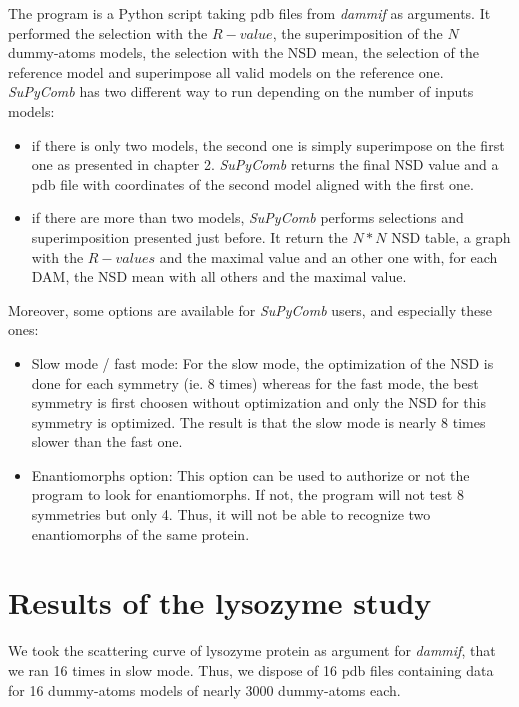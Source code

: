 \documentclass[a4paper, 11pt]{report}
\begin{document}
The program is a Python script taking pdb files from \textit{dammif} 
as arguments. 
It performed the selection with the $R-value$, the superimposition of 
the $N$ dummy-atoms models, the selection with the NSD mean, the 
selection of the reference model and superimpose all valid models on 
the reference one.\\
\textit{SuPyComb} has two different way to run depending on the number 
of inputs models:
\begin{itemize}
  \item if there is only two models, the second one is simply 
        superimpose on the first one as presented in chapter 2.
        \textit{SuPyComb} returns the final NSD value and a pdb file 
        with coordinates of the second model aligned with the first one.
  \item if there are more than two models, \textit{SuPyComb} performs 
        selections and superimposition presented just before. 
        It return the $N*N$ NSD table, a graph with the $R-values$ and 
        the maximal value and an other one with, for each DAM, the NSD 
        mean with all others and the maximal value. 
\end{itemize}
Moreover, some options are available for \textit{SuPyComb} users, and 
especially these ones:
\begin{itemize}
  \item Slow mode / fast mode:
  For the slow mode, the optimization of the NSD is done for each symmetry 
  (ie. 8 times) whereas for the fast mode, the best symmetry is first 
  choosen without optimization and only the NSD for this symmetry is 
  optimized.
  The result is that the slow mode is nearly 8 times slower than the fast 
  one.
  \item Enantiomorphs option:
  This option can be used to authorize or not the program to look for 
  enantiomorphs. 
  If not, the program will not test 8 symmetries but only 4. 
  Thus, it will not be able to recognize two enantiomorphs of the 
  same protein.
\end{itemize}

\section{Results of the lysozyme study}%

We took the scattering curve of lysozyme protein as argument for 
\textit{dammif}, that we ran 16 times in slow mode. 
Thus, we dispose of 16 pdb files containing data for 16 dummy-atoms 
models of nearly 3000 dummy-atoms each.\\
\end{document}
